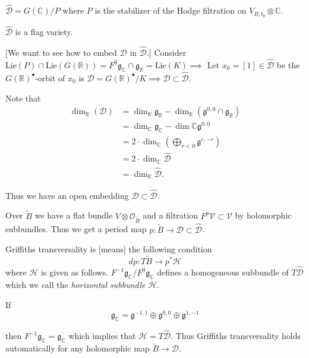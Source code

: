 \begin{definition}
\label{definition-dhat}
$\hat{\mathcal{D}}=G(\mathbb{C})/P$ where $P$
is the stabilizer
of the Hodge filtration on $V_{B,t_0}\otimes
\mathbb{C}$.
\end{definition}

\noindent
$\hat{\mathcal{D}}$ is a flag variety.

[We want to see how to embed $\mathcal{D}$ in
$\hat{\mathcal{D}}$.]
Consider $\text{Lie}(P) \cap
\text{Lie}(G(\mathbb{R}))
=F^0\mathfrak{g}_\mathbb{C} \cap
\mathfrak{g}_\mathbb{R}
=\text{Lie}(K)\implies $
Let $x_0=[1] \in \hat{\mathcal{D}}$
be the $G(\mathbb{R})^\bullet$-orbit of $x_0$
is
$\mathcal{D}=G(\mathbb{R})^\bullet/K
\implies \mathcal{D} \subset
\hat{\mathcal{D}}$.

Note that
$$
\begin{aligned}
\dim_\mathbb{R}(\mathcal{D})
&=\dim_\mathbb{R} \mathfrak{g}_\mathbb{R}
-\dim_\mathbb{R}(\mathfrak{g}^{0,0}\cap
\mathfrak{g}_\mathbb{R})\\
&=\dim_\mathbb{C}\mathfrak{g}_\mathbb{C}-
\dim\mathbb{C}\mathfrak{g}^{0,0}\\
&=2\cdot
\dim_\mathbb{C}\left(\bigoplus_{r<0}
\mathfrak{g}^{r,-r}\right)\\
&=2\cdot \dim_\mathbb{C}\hat{\mathcal{D}}\\
&=\dim_\mathbb{R}\hat{\mathcal{D}}.
\end{aligned}
$$

\noindent
Thus we have an open embedding $\mathcal{D}
\subset \hat{\mathcal{D}}$.

\medskip\noindent
Over $\tilde{B}$ we have a flat bundle
$V\otimes \mathcal{O}_{\tilde{B}}$
and a filtration $F^p \mathcal{V} \subset
\mathcal{V}$
by holomorphic subbundles.
Thus we get a period map
$p:\tilde{B}\to \mathcal{D} \subset
\hat{\mathcal{D}}$.

Griffiths transversality is [means] the
following condition
$$
dp:T\tilde{B}\to p^*\mathcal{H}
$$
where $\mathcal{H}$ is given as follows.
$F^{-1}\mathfrak{g}_\mathbb{C}/
F^0\mathfrak{g}_\mathbb{C}$
defines a homogeneous
subbundle of $T\hat{\mathcal{D}}$ which we
call
the {\it horizontal subbundle} $\mathcal{H}$.

\medskip\noindent
If
\begin{equation}
\label{equation-hermitian}
\mathfrak{g}_\mathbb{C}=\mathfrak{g}^{-1,1}
\oplus
\mathfrak{g}^{0,0}
\oplus \mathfrak{g}^{1,-1}
\end{equation}

\noindent
then
$F^{-1}\mathfrak{g}_\mathbb{C}=\mathfrak{g}
_\mathbb{C}$
which implies that
$\mathcal{H}=T\hat{\mathcal{D}}$.
Thus Griffiths transversality holds
automatically
for any holomorphic map $\tilde{B} \to
\mathcal{D}$.

